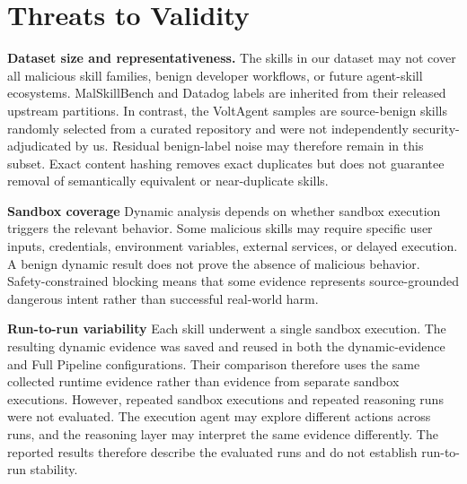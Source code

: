 \section{Threats to Validity}
\label{sec:threats-to-validity}

\textbf{Dataset size and representativeness.}
The skills in our dataset may not cover all malicious skill families,
benign developer workflows, or future agent-skill ecosystems.
MalSkillBench and Datadog labels are inherited from their released
upstream partitions. In contrast, the VoltAgent samples are
source-benign skills randomly selected from a curated repository and
were not independently security-adjudicated by us. Residual benign-label
noise may therefore remain in this subset. Exact content hashing removes
exact duplicates but does not guarantee removal of semantically
equivalent or near-duplicate skills.

\textbf{Sandbox coverage}
Dynamic analysis depends on whether sandbox execution triggers the relevant behavior. Some malicious skills may require specific user inputs, credentials, environment variables, external services, or delayed execution. A benign dynamic result does not prove the absence of malicious behavior. Safety-constrained blocking means that some evidence represents source-grounded dangerous intent rather than successful real-world harm.

\textbf{Run-to-run variability}
Each skill underwent a single sandbox execution.
The resulting dynamic evidence was saved and reused
in both the dynamic-evidence and Full Pipeline
configurations. Their comparison therefore uses
the same collected runtime evidence rather than
evidence from separate sandbox executions.
However, repeated sandbox executions and repeated
reasoning runs were not evaluated. The execution
agent may explore different actions across runs,
and the reasoning layer may interpret the same
evidence differently. The reported results therefore
describe the evaluated runs and do not establish
run-to-run stability.

